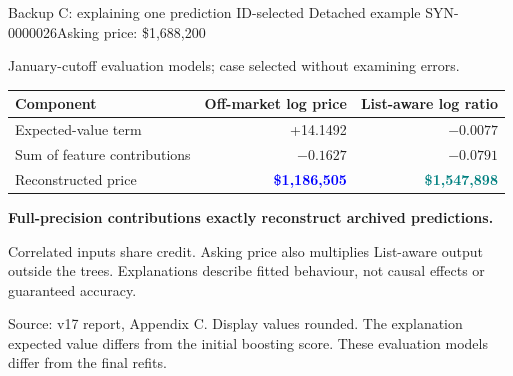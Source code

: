\documentclass[aspectratio=169,20pt]{beamer}
\newcommand{\smalltext}{\fontsize{15}{19}\selectfont}
\newcommand{\tinytext}{\fontsize{12}{15}\selectfont}
\newcommand{\takeaway}[1]{{\color{Teal}\bfseries #1}}
\newcommand{\sourceline}[1]{\par{\tinytext\color{Muted}#1\par}}
\begin{document}
\begin{frame}[t]{Backup C: explaining one prediction}
\relax
{\smalltext ID-selected Detached example SYN-0000026\quad\textbullet\quad Asking price: \$1,688,200}

{\smalltext January-cutoff evaluation models; case selected without examining errors.}\par
\vspace{5mm}
{\fontsize{19}{24}\selectfont
\renewcommand{\arraystretch}{1.4}
\noindent\begin{tabular*}{\textwidth}{@{}l@{\extracolsep{\fill}}rr@{}}
\toprule
\textbf{Component} & \textbf{Off-market log price} & \textbf{List-aware log ratio}\\
\midrule
Expected-value term & +14.1492 & $-0.0077$\\
Sum of feature contributions & $-0.1627$ & $-0.0791$\\
Reconstructed price & \textcolor{Blue}{\textbf{\$1,186,505}} & \textcolor{Teal}{\textbf{\$1,547,898}}\\
\bottomrule
\end{tabular*}}\par
\vspace{7mm}
\takeaway{Full-precision contributions exactly reconstruct archived predictions.}

{\smalltext Correlated inputs share credit. Asking price also multiplies List-aware output outside the trees. Explanations describe fitted behaviour, not causal effects or guaranteed accuracy.}
\vfill
\sourceline{Source: v17 report, Appendix C. Display values rounded. The explanation expected value differs from the initial boosting score. These evaluation models differ from the final refits.}
\end{frame}
\end{document}
